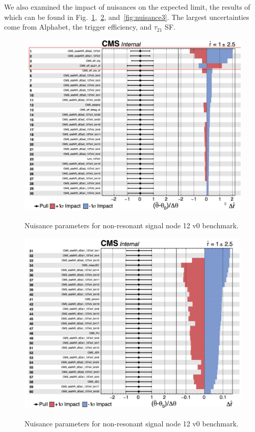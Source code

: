 We also examined the impact of nuisances on the expected limit, the results of which can be found in Fig.~\ref{fig:nuisance},~\ref{fig:nuisance2}, and~\ref{fig:nuisance3}. The largest uncertainties come from Alphabet, the trigger efficiency, and $\tau_{21}$ SF.
\begin{figure}[thb!]
\begin{center}
\includegraphics[scale=0.5]{Figures/nuisance1.pdf}\\
\end{center}
\caption{Nuisance parameters for non-resonant signal node 12 v0 benchmark.}
\label{fig:nuisance}
\end{figure}

\begin{figure}[thb!]
\begin{center}
\includegraphics[scale=0.5]{Figures/nuisance2.pdf}\\
\end{center}
\caption{Nuisance parameters for non-resonant signal node 12 v0 benchmark.}
\label{fig:nuisance2}
\end{figure}


